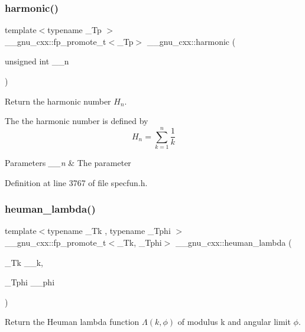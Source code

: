 \subsubsection{\texorpdfstring{harmonic()}{harmonic()}}
{\footnotesize\ttfamily template$<$typename \+\_\+\+Tp $>$ \\
\+\_\+\+\_\+gnu\+\_\+cxx\+::fp\+\_\+promote\+\_\+t$<$\+\_\+\+Tp$>$ \+\_\+\+\_\+gnu\+\_\+cxx\+::harmonic (\begin{DoxyParamCaption}\item[{unsigned int}]{\+\_\+\+\_\+n }\end{DoxyParamCaption})\hspace{0.3cm}{\ttfamily [inline]}}

Return the harmonic number $ H_n $.

The the harmonic number is defined by \[ H_n = \sum_{k=1}^{n}\frac{1}{k} \]


\begin{DoxyParams}{Parameters}
{\em \+\_\+\+\_\+n} & The parameter \\
\hline
\end{DoxyParams}


Definition at line 3767 of file specfun.\+h.

\mbox{\label{group__mathsf__gnu_ga7537f96eedc8571ed1987481b2863e89}} 
\subsubsection{\texorpdfstring{heuman\+\_\+lambda()}{heuman\_lambda()}}
{\footnotesize\ttfamily template$<$typename \+\_\+\+Tk , typename \+\_\+\+Tphi $>$ \\
\+\_\+\+\_\+gnu\+\_\+cxx\+::fp\+\_\+promote\+\_\+t$<$\+\_\+\+Tk, \+\_\+\+Tphi$>$ \+\_\+\+\_\+gnu\+\_\+cxx\+::heuman\+\_\+lambda (\begin{DoxyParamCaption}\item[{\+\_\+\+Tk}]{\+\_\+\+\_\+k,  }\item[{\+\_\+\+Tphi}]{\+\_\+\+\_\+phi }\end{DoxyParamCaption})\hspace{0.3cm}{\ttfamily [inline]}}

Return the Heuman lambda function $ \Lambda(k,\phi) $ of modulus {\ttfamily k} and angular limit $ \phi $.


